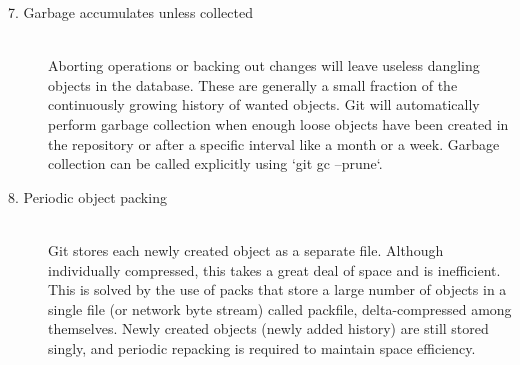 \begin{description}
\item[7. Garbage accumulates unless collected] \hfill \\
  Aborting operations or backing out changes will leave useless
  dangling objects in the database. These are generally a small
  fraction of the continuously growing history of wanted objects. Git
  will automatically perform garbage collection when enough loose
  objects have been created in the repository or after a specific
  interval like a month or a week. Garbage collection can be called
  explicitly using ‘git gc –prune‘.

\item[8. Periodic object packing] \hfill \\
  Git stores each newly created object as a separate file. Although
  individually compressed, this takes a great deal of space and is
  inefficient. This is solved by the use of packs that store a large
  number of objects in a single file (or network byte stream) called
  packfile, delta-compressed among themselves. Newly created objects
  (newly added history) are still stored singly, and periodic
  repacking is required to maintain space efficiency.

\end{description}